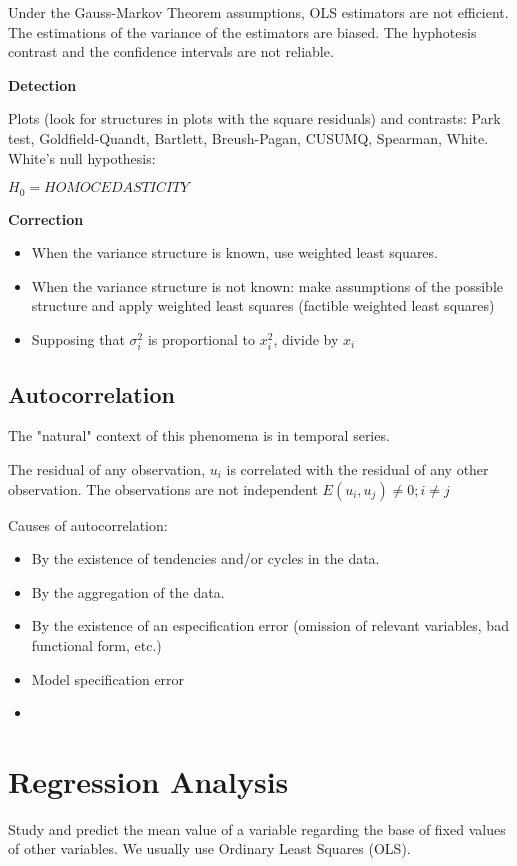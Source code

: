 \documentclass[10pt,landscape]{article}
\begin{document}
\begin{multicols}{3}
Under the Gauss-Markov Theorem assumptions, OLS estimators are not efficient. The estimations of the variance of the estimators are biased. The hyphotesis contrast and the confidence intervals are not reliable.

\textbf{Detection}

Plots (look for structures in plots with the square residuals) and contrasts: Park test, Goldfield-Quandt, Bartlett, Breush-Pagan, CUSUMQ, Spearman, White.
White's null hypothesis:

$H_0 = HOMOCEDASTICITY$

\textbf{Correction}
\begin{itemize}
	\item When the variance structure is known, use weighted least squares.
	\item When the variance structure is not known: make assumptions of the possible structure and apply weighted least squares (factible weighted least squares)
	\item Supposing that $\sigma_i^2$ is proportional to $x_i^2$, divide by $x_i$
\end{itemize}

\subsection*{Autocorrelation}

The "natural" context of this phenomena is in temporal series.

The residual of any observation, $u_i$ is correlated with the residual of any other observation. The observations are not independent $E(u_i,u_j) \neq 0; i \neq j$

Causes of autocorrelation:

\begin{itemize}
\item By the existence of tendencies and/or cycles in the data.
\item By the aggregation of the data.
\item By the existence of an especification error (omission of relevant variables, bad functional form, etc.)
\item Model specification error
\item 
\end{itemize}




\section*{Regression Analysis}
Study and predict the mean value of a variable regarding the base of fixed values of other variables.
We usually use Ordinary Least Squares (OLS).


\end{multicols}
\end{document}
